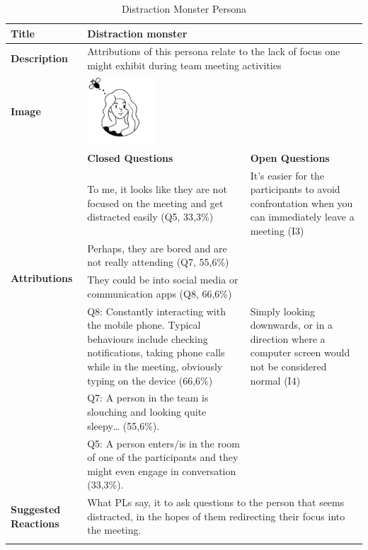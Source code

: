 \begin{longtable}[t]{ p{}  p{} p{} }
\caption{Distraction Monster Persona}
\label{tab:distraction}\\
\hline
\textbf{Title} & Distraction monster \\
    \hline
   \textbf{Description} &  \multicolumn{2}{p{.80\textwidth}}{Attributions of this persona relate to the lack of focus one might exhibit during team meeting activities} \\
   \hline
   \textbf{Image} &  \includegraphics[valign=t, width=1in, margin=0pt 3pt 0pt 3pt]{figures/Distraction.png} \\
   \hline
    & \textbf{Closed Questions} & \textbf{Open Questions} \\
    \hline
    \multirow{4}{4cm}{\textbf{Attributions}}  & To me, it looks like they are not focused on the meeting and get distracted easily (Q5, 33,3\%) & It's easier for the participants to avoid confrontation when you can immediately leave a meeting (I3) \\
     & Perhaps, they are bored and are not really attending (Q7, 55,6\%) \\
     & They could be into social media or communication apps (Q8, 66,6\%) \\
    \hline
    \multirow{4}{4cm}{\textbf{Behaviours}}  & Q8: Constantly interacting with the mobile phone. Typical behaviours include checking notifications, taking phone calls while in the meeting, obviously typing on the device (66,6\%) & Simply looking downwards, or in a direction where a computer screen would not be considered normal (I4) \\
     & Q7: A person in the team is slouching and looking quite sleepy… (55,6\%). \\
     & Q5: A person enters/is in the room of one of the participants and they might even engage in conversation (33,3\%). \\
    \hline
     \textbf{Suggested Reactions} & \multicolumn{2}{p{.80\textwidth}}{What PLs say, it to ask questions to the person that seems distracted, in the hopes of them redirecting their focus into the meeting. } \\
    \hline
\label{tab:multicol}
\end{longtable}

